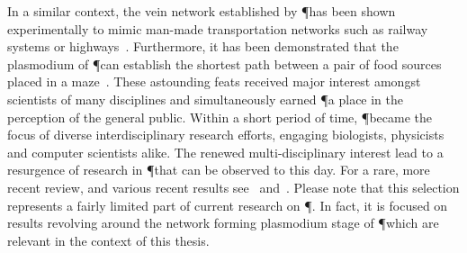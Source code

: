 		In a similar context, the vein network established by \P has been shown experimentally to mimic man-made transportation networks such as railway systems or highways~\cite{tero2010rules,Tero2006115,Nakagaki20041}. Furthermore, it has been demonstrated that the plasmodium of \P can establish the shortest path between a pair of food sources placed in a maze~\cite{nakagaki2000intelligence}. These astounding feats received major interest amongst scientists of many disciplines and simultaneously earned \P a place in the perception of the general public. Within a short period of time, \P became the focus of diverse interdisciplinary research efforts, engaging biologists, physicists and computer scientists alike. The renewed multi-disciplinary interest lead to a resurgence of research in \P that can be observed to this day. For a rare, more recent review, and various recent results see~\cite{ueda2005intelligent} and~\cite{takamatsu2009environment,shirakawa2007emergence,alim2013random,Tero2007553,nakagaki2004obtaining}. Please note that this selection represents a fairly limited part of current research on \P. In fact, it is focused on results revolving around the network forming plasmodium stage of \P which are relevant in the context of this thesis.

		\FloatBarrier

